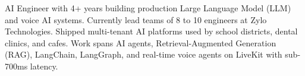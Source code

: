 \vspace{3pt}
\small{AI Engineer with 4+ years building production Large Language Model (LLM) and voice AI systems. Currently lead teams of 8 to 10 engineers at Zylo Technologies. Shipped multi-tenant AI platforms used by school districts, dental clinics, and cafes. Work spans AI agents, Retrieval-Augmented Generation (RAG), LangChain, LangGraph, and real-time voice agents on LiveKit with sub-700ms latency.}
\vspace{-4pt}
